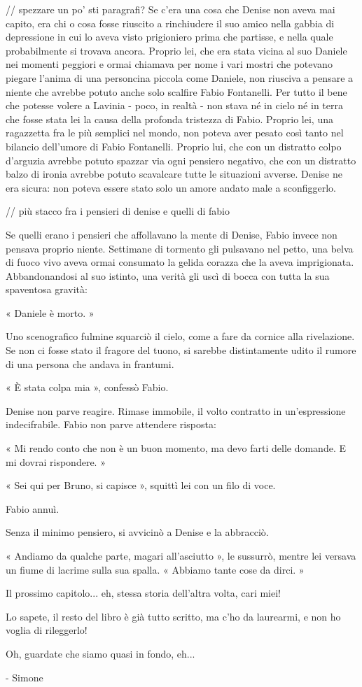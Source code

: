 // spezzare un po' sti paragrafi?
Se c'era una cosa che Denise non aveva mai capito, era chi o cosa fosse riuscito a rinchiudere il suo amico nella gabbia di depressione in cui lo aveva visto prigioniero prima che partisse, e nella quale probabilmente si trovava ancora. Proprio lei, che era stata vicina al suo Daniele nei momenti peggiori e ormai chiamava per nome i vari mostri che potevano piegare l'anima di una personcina piccola come Daniele, non riusciva a pensare a niente che avrebbe potuto anche solo scalfire Fabio Fontanelli. Per tutto il bene che potesse volere a Lavinia - poco, in realtà - non stava né in cielo né in terra che fosse stata lei la causa della profonda tristezza di Fabio. Proprio lei, una ragazzetta fra le più semplici nel mondo, non poteva aver pesato così tanto nel bilancio dell'umore di Fabio Fontanelli. Proprio lui, che con un distratto colpo d'arguzia avrebbe potuto spazzar via ogni pensiero negativo, che con un distratto balzo di ironia avrebbe potuto scavalcare tutte le situazioni avverse. Denise ne era sicura: non poteva essere stato solo un amore andato male a sconfiggerlo.

// più stacco fra i pensieri di denise e quelli di fabio

Se quelli erano i pensieri che affollavano la mente di Denise, Fabio invece non pensava proprio niente. Settimane di tormento gli pulsavano nel petto, una belva di fuoco vivo aveva ormai consumato la gelida corazza che la aveva imprigionata. Abbandonandosi al suo istinto, una verità gli uscì di bocca con tutta la sua spaventosa gravità:

« Daniele è morto. »

Uno scenografico fulmine squarciò il cielo, come a fare da cornice alla rivelazione. Se non ci fosse stato il fragore del tuono, si sarebbe distintamente udito il rumore di una persona che andava in frantumi.

« È stata colpa mia », confessò Fabio.

Denise non parve reagire. Rimase immobile, il volto contratto in un'espressione indecifrabile. Fabio non parve attendere risposta:

« Mi rendo conto che non è un buon momento, ma devo farti delle domande. E mi dovrai rispondere. »

« Sei qui per Bruno, si capisce », squittì lei con un filo di voce.

Fabio annuì.

Senza il minimo pensiero, si avvicinò a Denise e la abbracciò.

« Andiamo da qualche parte, magari all'asciutto », le sussurrò, mentre lei versava un fiume di lacrime sulla sua spalla. « Abbiamo tante cose da dirci. »



Il prossimo capitolo... eh, stessa storia dell'altra volta, cari miei!

Lo sapete, il resto del libro è già tutto scritto, ma c'ho da laurearmi, e non ho voglia di rileggerlo!

Oh, guardate che siamo quasi in fondo, eh...

- Simone
